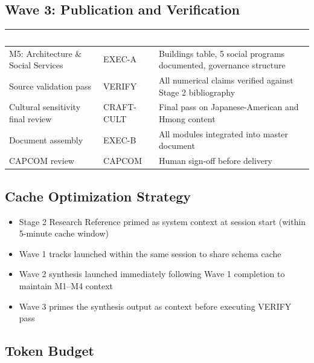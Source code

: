 \documentclass[11pt,letterpaper]{article}
\newcommand{\tableheader}[1]{\textbf{\sffamily\textcolor{white}{#1}}}
\begin{document}
\subsection{Wave 3: Publication and Verification}

\begin{center}
\begin{tabularx}{\textwidth}{L{3cm}L{2.5cm}X}
\toprule
{}
\tableheader{Task} & \tableheader{Agent} & \tableheader{Output} \\
\midrule
M5: Architecture \& Social Services & EXEC-A & Buildings table, 5 social programs documented, governance structure \\
Source validation pass & VERIFY & All numerical claims verified against Stage 2 bibliography \\
Cultural sensitivity final review & CRAFT-CULT & Final pass on Japanese-American and Hmong content \\
Document assembly & EXEC-B & All modules integrated into master document \\
CAPCOM review & CAPCOM & Human sign-off before delivery \\
\bottomrule
\end{tabularx}
\end{center}

\subsection{Cache Optimization Strategy}

\begin{itemize}[noitemsep]
  \item Stage 2 Research Reference primed as system context at session start (within 5-minute cache window)
  \item Wave 1 tracks launched within the same session to share schema cache
  \item Wave 2 synthesis launched immediately following Wave 1 completion to maintain M1--M4 context
  \item Wave 3 primes the synthesis output as context before executing VERIFY pass
\end{itemize}

\subsection{Token Budget}
\end{document}
